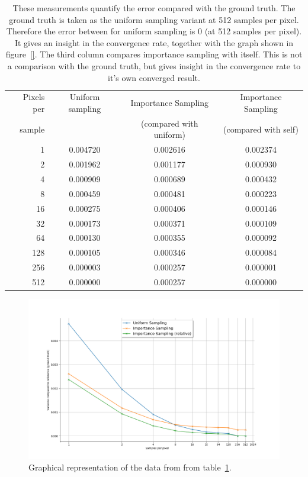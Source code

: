 \documentclass[11pt,a4paper]{report}
\begin{document}
\begin{table}
\begin{tabular}{r|c|c|c}
Pixels per & Uniform sampling & Importance Sampling & Importance Sampling \\
sample &  & (compared with uniform) & (compared with self) \\
\hline \hline
1 & 0.004720 & 0.002616 & 0.002374 \\
2 & 0.001962 & 0.001177 & 0.000930 \\
4 & 0.000909 & 0.000689 & 0.000432\\
8 & 0.000459 & 0.000481 & 0.000223 \\
16 & 0.000275 & 0.000406 & 0.000146 \\
32 & 0.000173 & 0.000371 & 0.000109 \\
64 & 0.000130 & 0.000355 & 0.000092 \\
128 & 0.000105 & 0.000346 & 0.000084 \\
256 & 0.000003 & 0.000257 & 0.000001 \\
512 & 0.000000 & 0.000257 & 0.000000 \\
\end{tabular}
\caption{These measurements quantify the error compared with the ground truth. The ground truth is taken as the uniform sampling variant at 512 samples per pixel. Therefore the error between for uniform sampling is 0 (at 512 samples per pixel). It gives an insight in the convergence rate, together with the graph shown in figure~\ref{}. The third column compares importance sampling with itself. This is not a comparison with the ground truth, but gives insight in the convergence rate to it's own converged result.}
\label{table_variance_to_groundtruth}
\end{table}

\begin{figure}
\begin{center}
\includegraphics[scale=0.4]{variance-results/variance-plot.png}
\end{center}
\caption{Graphical representation of the data from from table~\ref{table_variance_to_groundtruth}.}
\label{fig_variance_plot}
\end{figure}
\end{document}
